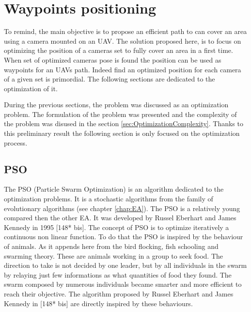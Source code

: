 \chapter{Waypoints positioning } 
\minitoc
To remind, the main objective is to propose an efficient path to can cover an area using a camera mounted on an UAV. The solution proposed here, is to focus on optimizing the position of a cameras set to fully cover an area in a first time. When set of optimized cameras pose is found the position can be used as waypoints for an UAVs path. Indeed find an optimized position for each camera of a given set is primordial. The following sections are dedicated to the optimization of it. 





During the previous sections, the problem was discussed as an optimization problem. The formulation of the problem was presented  and  the complexity of the problem was disused in the section \ref{sec:OptimizationComplexity}. Thanks to this preliminary result the following section is only focused on the optimization process. 



\section{PSO }

The PSO (Particle Swarm Optimization) is an algorithm dedicated to the optimization problems. It is a stochastic algorithms from the family of evolutionary algorithms (see chapter \ref{chap:EA}). 
The PSO is a relatively young compared then the other EA. It was developed by Russel Eberhart and James Kennedy in 1995 [148* bis]\cite{148*eberhart1995}. The concept of PSO is to optimize iteratively a continuous non linear function. To do that the PSO is inspired by the behaviour of animals. As it appends here from the bird flocking, fish schooling and swarming theory. These are animals working in a group to seek food. 
The direction to take is not decided by one leader, but by all individuals in the swarm by relaying just few informations as what quantities of food they found. 
The swarm composed by numerous individuals became smarter and more efficient to reach their objective. 
The algorithm proposed by Russel Eberhart and James Kennedy in [148* bis] \cite{148*eberhart1995} are directly inspired by these behaviours.

